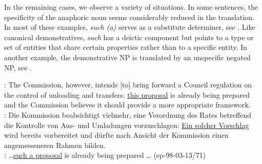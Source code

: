 \documentclass[output=paper]{LSP/langsci}
\begin{document}




In the remaining cases, we observe a variety of situations. In some sentences, the specificity of the anaphoric noun seems considerably reduced in the translation. In most of these examples, \textit{such (a)} serves as a substitute determiner, see . Like canonical demonstratives, \textit{such} has a deictic component but  points to a type or set of entities that share certain properties rather than to a specific entity. In another example, the demonstrative NP is translated by an unspecific negated NP, see .

\ea \label{ex:such}
\ENo: The Commission, however, intends [to] bring forward a Council regulation on the control of unloading and transfers: \ul{this proposal} is already being prepared and the Commission believes it should provide a more appropriate framework. \\
\DEt: Die Kommission beabsichtigt vielmehr, eine Verordnung des Rates betreffend die Kontrolle von Aus- und Umladungen vorzuschlagen: \ul{Ein solcher Vorschlag} wird bereits vorbereitet und dürfte nach Ansicht der Kommission einen angemesseneren Rahmen bilden. \\
\DElit: \dots \ul{such a proposal} is already being prepared \dots 
\hfill{(ep-98-03-13/71)}
\z
\end{document}
